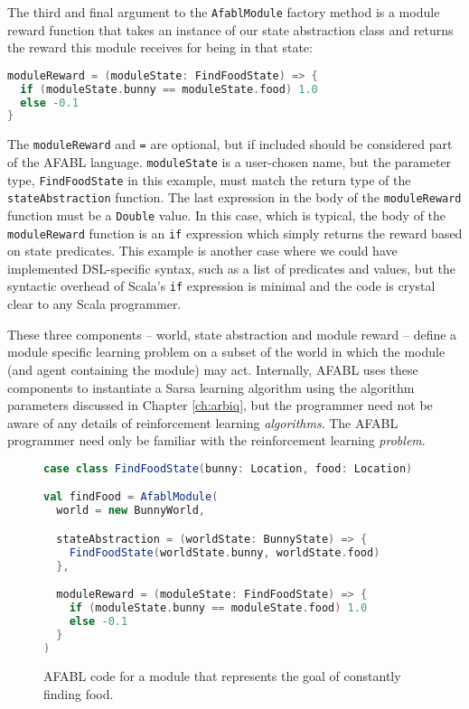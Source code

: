 The third and final argument to the {\tt AfablModule} factory method is a module reward function that takes an instance of our state abstraction class and returns the reward this module receives for being in that state:

\begin{center}
\begin{lstlisting}[language=Scala,frame=none]
moduleReward = (moduleState: FindFoodState) => {
  if (moduleState.bunny == moduleState.food) 1.0
  else -0.1
}
\end{lstlisting}
\end{center}

The {\tt moduleReward} and {\tt =} are optional, but if included should be considered part of the AFABL language. {\tt moduleState} is a user-chosen name, but the parameter type, {\tt FindFoodState} in this example, must match the return type of the {\tt stateAbstraction} function. The last expression in the body of the {\tt moduleReward} function must be a {\tt Double} value. In this case, which is typical, the body of the {\tt moduleReward} function is an {\tt if} expression which simply returns the reward based on state predicates. This example is another case where we could have implemented DSL-specific syntax, such as a list of predicates and values, but the syntactic overhead of Scala's {\tt if} expression is minimal and the code is crystal clear to any Scala programmer.

These three components -- world, state abstraction and module reward -- define a module specific learning problem on a subset of the world in which the module (and agent containing the module) may act. Internally, AFABL uses these components to instantiate a Sarsa learning algorithm using the algorithm parameters discussed in Chapter \ref{ch:arbiq}, but the programmer need not be aware of any details of reinforcement learning {\it algorithms}. The AFABL programmer need only be familiar with the reinforcement learning {\it problem}.

\begin{figure}[!h]
\begin{center}

\begin{lstlisting}[language=Scala]
case class FindFoodState(bunny: Location, food: Location)

val findFood = AfablModule(
  world = new BunnyWorld,

  stateAbstraction = (worldState: BunnyState) => {
    FindFoodState(worldState.bunny, worldState.food)
  },

  moduleReward = (moduleState: FindFoodState) => {
    if (moduleState.bunny == moduleState.food) 1.0
    else -0.1
  }
)
\end{lstlisting}

\caption{AFABL code for a module that represents the goal of constantly finding food.}
\end{center}
\label{fig:find-food-code}
\end{figure}

